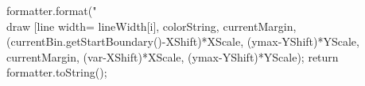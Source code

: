 \begin{code}
\begin{hide}
{{{{{{                  formatter.format("\\draw [line width=%
                        lineWidth[i], colorString,
                        currentMargin, (currentBin.getStartBoundary()-XShift)*XScale, (ymax-YShift)*YScale,
                        currentMargin, (var-XShift)*XScale, (ymax-YShift)*YScale);
               }
            }
         }
      }
      return formatter.toString();
   }
}\end{hide}
\end{code}

